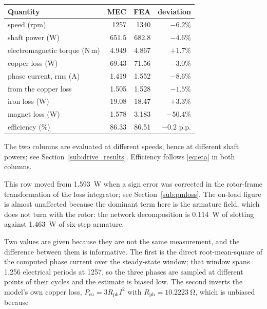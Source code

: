 \documentclass[10pt,a4paper,twocolumn]{article}
\theoremstyle{plain}
\theoremstyle{remark}
\begin{document}
\begin{table}[!ht]
\centering
\footnotesize
\begin{threeparttable}
\begin{tabular}{lrrr}
\toprule
Quantity & MEC & FEA & deviation \\
\midrule
speed (rpm)                   & 1257  & 1340  & $-6.2\%$ \\
shaft power (W)\tnote{a}      & 651.5 & 682.8 & $-4.6\%$ \\
electromagnetic torque (N\,m) & 4.949 & 4.867 & $+1.7\%$ \\
copper loss (W)               & 69.43 & 71.56 & $-3.0\%$ \\
phase current, rms (A)\tnote{b}& 1.419 & 1.552 & $-8.6\%$ \\
\quad from the copper loss\tnote{b} & 1.505 & 1.528 & $-1.5\%$ \\
iron loss (W)                 & 19.08 & 18.47 & $+3.3\%$ \\
magnet loss (W)\tnote{c}      & 1.578 & 3.183 & $-50.4\%$ \\
efficiency (\%)\tnote{a}      & 86.33 & 86.51 & $-0.2$ p.p. \\
\bottomrule
\end{tabular}
\begin{tablenotes}[flushleft]\footnotesize
\item[a] The two columns are evaluated at different speeds, hence at
different shaft powers; see Section~\ref{sub:drive_results}. Efficiency
follows \eqref{eq:eta} in both columns.
\item[c] This row moved from \SI{1.593}{\watt} when a sign error was
corrected in the rotor-frame transformation of the loss integrator; see
Section~\ref{sub:pmloss}. The on-load figure is almost unaffected
because the dominant term here is the armature field, which does not
turn with the rotor: the network decomposition is
\SI{0.114}{\watt} of slotting against \SI{1.463}{\watt} of six-step
armature.
\item[b] Two values are given because they are not the same measurement,
and the difference between them is informative.
The first is the direct root-mean-square of the computed phase current
over the steady-state window; that window spans 1.256 electrical periods
at \SI{1257}{\rpm}, so the three phases are sampled at different points
of their cycles and the estimate is biased low. The second inverts the
model's own copper loss, $P_{\mathrm{cu}}=3R_{\mathrm{ph}}I^2$ with
$R_{\mathrm{ph}}=\SI{10.2223}{\ohm}$, which is unbiased because

\end{tablenotes}
\end{threeparttable}
\end{table}
\end{document}
